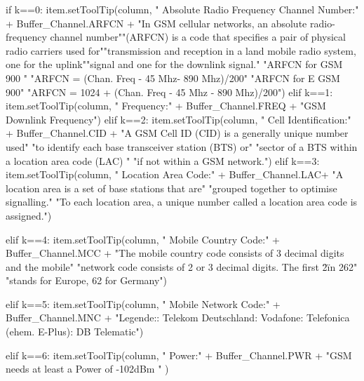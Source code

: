 \begin{code}[firstnumber=204,numbers=left,stepnumber=1,caption={Parameterinformationen},captionpos=b,label={code3}]
if k==0:
	item.setToolTip(column, " Absolute Radio Frequency Channel Number:\n\n " + Buffer_Channel.ARFCN 
	+ "\n\n In GSM cellular networks, an absolute radio-frequency channel number\n ""(ARFCN) is a code that specifies a pair of physical radio carriers used for\n ""transmission and reception in a land mobile radio system, one for the uplink\n ""signal and one for the downlink signal.\n\n "
	"ARFCN for GSM 900 \n "
	"ARFCN = (Chan. Freq - 45 Mhz- 890 Mhz)/200\n\n "
	"ARFCN for E GSM 900\n "
	"ARFCN = 1024 + (Chan. Freq - 45 Mhz - 890 Mhz)/200\n ")
elif k==1:
	item.setToolTip(column, " Frequency:\n\n " + Buffer_Channel.FREQ + "\n\n GSM Downlink Frequency")
elif k==2:
	item.setToolTip(column, " Cell Identification:\n\n " + Buffer_Channel.CID +
	"\n\n A GSM Cell ID (CID) is a generally unique number used\n "
	"to identify each base transceiver station (BTS) or\n "
	"sector of a BTS within a location area code (LAC) \n "
	"if not within a GSM network.")				
elif k==3:
	item.setToolTip(column, " Location Area Code:\n\n " + Buffer_Channel.LAC+
	"\n\n A location area is a set of base stations that are\n "
	"grouped together to optimise signalling.\n "
	"To each location area, a unique number called a location area code is assigned.\n ")
				    
					
elif k==4:
	item.setToolTip(column, " Mobile Country Code:\n\n " + Buffer_Channel.MCC +
	"\n\n The mobile country code consists of 3 decimal digits and the mobile\n "
	"network code consists of 2 or 3 decimal digits. The first \"2\" in 262\n "
	"stands for Europe, 62 for Germany")
				
elif k==5:
	item.setToolTip(column, " Mobile Network Code:\n\n" + Buffer_Channel.MNC +
	"\n\n Legende:: Telekom Deutschland: Vodafone: Telefonica (ehem. E-Plus): DB Telematic")
	
elif k==6:
	item.setToolTip(column, " Power:\n\n " + Buffer_Channel.PWR + 
	"\n\n GSM needs at least a Power of -102dBm " )
\end{code}
 